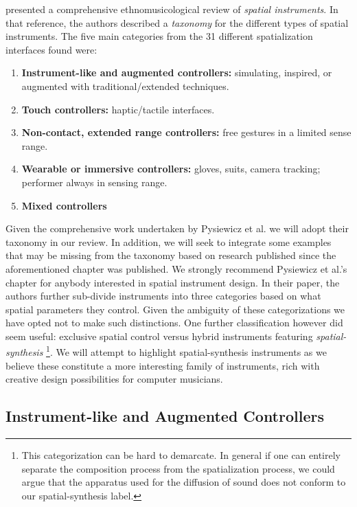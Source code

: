 \cite{pysiewicz2017instruments} presented a comprehensive ethnomusicological review of \textit{spatial instruments}. In that reference, the authors described a \textit{taxonomy} for the different types of spatial instruments. The five main categories from the 31 different spatialization interfaces found were: 

\begin{enumerate}
    \item \textbf{Instrument-like and augmented controllers:} simulating, inspired, or augmented with traditional/extended techniques. 
    \item \textbf{Touch controllers:} haptic/tactile interfaces.
    \item \textbf{Non-contact, extended range controllers:} free gestures in a limited sense range. 
    \item \textbf{Wearable or immersive controllers:} gloves, suits, camera tracking; performer always in sensing range.
    \item \textbf{Mixed controllers}
\end{enumerate}

Given the comprehensive work undertaken by Pysiewicz et al. we will adopt their taxonomy in our review. In addition, we will seek to integrate some examples that may be missing from the taxonomy based on research published since the aforementioned chapter was published. We strongly recommend Pysiewicz et al.'s chapter for anybody interested in spatial instrument design. In their paper, the authors further sub-divide instruments into three categories based on what spatial parameters they control. Given the ambiguity of these categorizations we have opted not to make such distinctions. One further classification however did seem useful: exclusive spatial control versus hybrid instruments featuring \textit{spatial-synthesis} \footnote{This categorization can be hard to demarcate. In general if one can entirely separate the composition process from the spatialization process, we could argue that the apparatus used for the diffusion of sound does not conform to our spatial-synthesis label.}. We will attempt to highlight spatial-synthesis instruments as we believe these constitute a more interesting family of instruments, rich with creative design possibilities for computer musicians.

\subsection{Instrument-like and Augmented Controllers}

